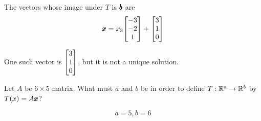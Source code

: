\documentclass{../mathhomework}
\newenvironment{Mat}{\begin{bmatrix}}{\end{bmatrix}}
\begin{document}
\begin{problem}[1.8\#5]
\begin{solution}
        The vectors whose image under $T$ is $\pmb{b}$ are
        \begin{equation*}
            \Vect{x} = x_3\begin{Mat}
                -3 \\ -2 \\ 1
            \end{Mat} + \begin{Mat}
                3 \\ 1 \\ 0
            \end{Mat}
        \end{equation*}

        One such vector is $\begin{Mat}
            3 \\ 1 \\ 0
        \end{Mat}$, but it is not a unique solution.
    \end{solution}
\end{problem}

\begin{problem}[1.8\#7]
    Let $A$ be $6 \times 5$ matrix. What must $a$ and $b$ be in order to define $T: \mathbb{R}^a \to \mathbb{R}^b$ by $T(x) = A\pmb{x}$?

    \begin{solution}
        \begin{equation*}
            a = 5, b = 6
        \end{equation*}
    \end{solution}
\end{problem}

\newpage
\end{document}
